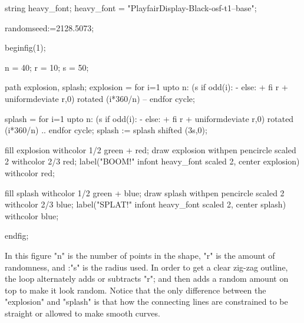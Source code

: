 \documentclass[a4paper,landscape]{article}
\begin{document}
\begin{smallcode}
string heavy_font; 
heavy_font = "PlayfairDisplay-Black-osf-t1--base";

randomseed:=2128.5073;

beginfig(1);  

n = 40; r = 10; s = 50;

path explosion, splash;
explosion = for i=1 upto n:
  (s if odd(i): - else: + fi r + uniformdeviate r,0) rotated (i*360/n) --
endfor cycle; 

splash = for i=1 upto n:
  (s if odd(i): - else: + fi r + uniformdeviate r,0) rotated (i*360/n) ..
endfor cycle; 
splash := splash shifted (3s,0);

fill explosion withcolor 1/2 green + red;
draw explosion withpen pencircle scaled 2 withcolor 2/3 red;
label("BOOM!" infont heavy_font scaled 2, center explosion) withcolor red;

fill splash withcolor 1/2 green + blue;
draw splash withpen pencircle scaled 2 withcolor 2/3 blue;
label("SPLAT!" infont heavy_font scaled 2, center splash) withcolor blue;

endfig;
\end{smallcode}

\noindent
In this figure "n" is the number of points in the shape, "r" is the amount of
randomness, and :"s" is the radius used.
In order to get a clear zig-zag outline, the loop alternately adds or subtracts "r";
and then adds a random amount on top to make it look random.
Notice that the only difference between the "explosion" and "splash" is that how
the connecting lines are constrained to be straight or allowed to make smooth
curves.
\end{document}
